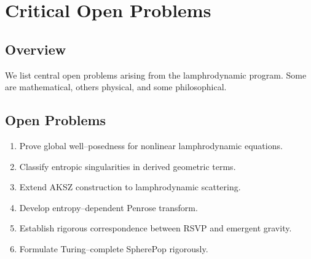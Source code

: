 
\chapter{Critical Open Problems}
\label{chap:open-problems}

\section{Overview}

We list central open problems arising from the lamphrodynamic program.
Some are mathematical, others physical, and some philosophical.

\section{Open Problems}

\begin{enumerate}
\item Prove global well--posedness for nonlinear lamphrodynamic equations.
\item Classify entropic singularities in derived geometric terms.
\item Extend AKSZ construction to lamphrodynamic scattering.
\item Develop entropy--dependent Penrose transform.
\item Establish rigorous correspondence between RSVP and emergent gravity.
\item Formulate Turing--complete SpherePop rigorously.
\end{enumerate}


\newpage
